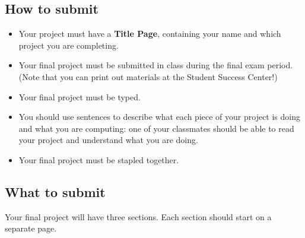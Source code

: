 \subsection*{How to submit}
\begin{itemize}

\item Your project must have a {\bf Title Page},  containing your name and which project you are completing.

\item Your final project must be submitted in class during the final exam period. (Note that you can print out materials at the Student Success Center!)

\item Your final project must be typed.

\item You should use sentences to describe what each piece of your project is doing and what you are computing: one of your classmates should be able to read your project and understand what you are doing.

\item Your final project must be stapled together.
\end{itemize}

\subsection*{What to submit}

Your final project will have three sections. Each section should start on a separate page.


